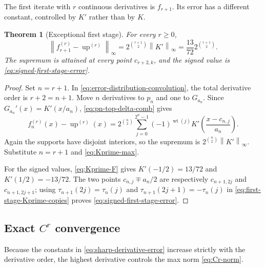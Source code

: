 \documentclass[11pt,oneside]{article}
\newtheorem{theorem}{Theorem}[section]
\theoremstyle{definition}
\theoremstyle{remark}
\newcommand{\Up}{\operatorname{up}}
\newcommand{\wt}{\operatorname{wt}}
\newcommand{\norm}[1]{\left\lVert#1\right\rVert}
\begin{document}
The first iterate with $r$ continuous derivatives is $f_{r+1}$.  Its error has a different
constant, controlled by $K'$ rather than by $K$.

\begin{theorem}[Exceptional first stage]
\label{thm:first-admissible-stage}
For every $r\ge0$,
\begin{equation}
 \norm{f_{r+1}^{(r)}-\Up^{(r)}}_\infty
 =2^{\binom{r+1}{2}}\norm{K'}_\infty
 =\frac{13}{72}2^{\binom{r+1}{2}}.
 \label{eq:first-stage-full}
\end{equation}
The supremum is attained at every point $c_{r+2,k}$, and the signed value is
\eqref{eq:signed-first-stage-error}.
\end{theorem}

\begin{proof}
Set $n=r+1$.  In \eqref{eq:error-distribution-convolution}, the total derivative order is
$r+2=n+1$.  Move $n$ derivatives to $p_n$ and one to $G_{a_n}$.  Since
$G_{a_n}'(x)=K'(x/a_n)$, \eqref{eq:pn-top-delta-comb} gives
\begin{equation}
 f_n^{(r)}(x)-\Up^{(r)}(x)
 =2^{\binom n2}\sum_{j=0}^{2^n-1}(-1)^{\wt(j)}
 K'\left(\frac{x-c_{n,j}}{a_n}\right).
 \label{eq:first-stage-Kprime-copies}
\end{equation}
Again the supports have disjoint interiors, so the supremum is
$2^{\binom n2}\norm{K'}_\infty$.  Substitute $n=r+1$ and
\eqref{eq:Kprime-max}.

For the signed values, \eqref{eq:Kprime-F} gives
$K'(-1/2)=13/72$ and $K'(1/2)=-13/72$.  The two points
$c_{n,j}\mp a_n/2$ are respectively $c_{n+1,2j}$ and $c_{n+1,2j+1}$; using
$\tau_{n+1}(2j)=\tau_n(j)$ and
$\tau_{n+1}(2j+1)=-\tau_n(j)$ in
\eqref{eq:first-stage-Kprime-copies} proves
\eqref{eq:signed-first-stage-error}.
\end{proof}

\subsection{Exact \texorpdfstring{$C^r$}{C-r} convergence}

Because the constants in \eqref{eq:sharp-derivative-error} increase strictly with the
derivative order, the highest derivative controls the max norm \eqref{eq:Cr-norm}.
\end{document}

